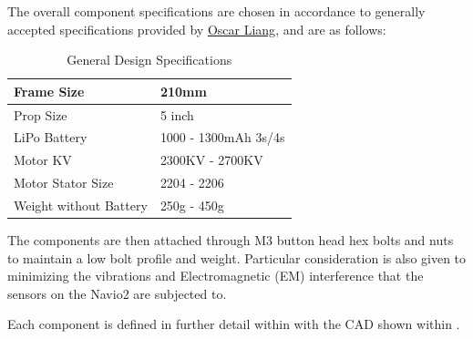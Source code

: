 \documentclass[12pt, titlepage]{article}
\begin{document}
\clearpage

The overall component specifications are chosen in accordance to generally accepted specifications provided by \href{https://oscarliang.com/table-prop-motor-lipo-weight/}{Oscar Liang}, and are as follows:

\begin{table}[!h]
\begin{center}
\caption {General Design Specifications}
\label{tab:genDesignSpecs}
\begin{tabular}{ | m{7cm} | m{8cm} | } 
\hline
Frame Size & 210mm \\
\hline
Prop Size & 5 inch \\
\hline
LiPo Battery & 1000 - 1300mAh 3s/4s \\
\hline
Motor KV & 2300KV - 2700KV \\
\hline
Motor Stator Size & 2204 - 2206 \\
\hline
Weight without Battery & 250g - 450g \\
\hline
\end{tabular}
\end{center}
\end{table}

The components are then attached through M3 button head hex bolts and nuts to maintain a low bolt profile and weight.
Particular consideration is also given to minimizing the vibrations and Electromagnetic (EM) interference that the sensors on the Navio2 are subjected to.

Each component is defined in further detail within  with the CAD shown within .
\end{document}
